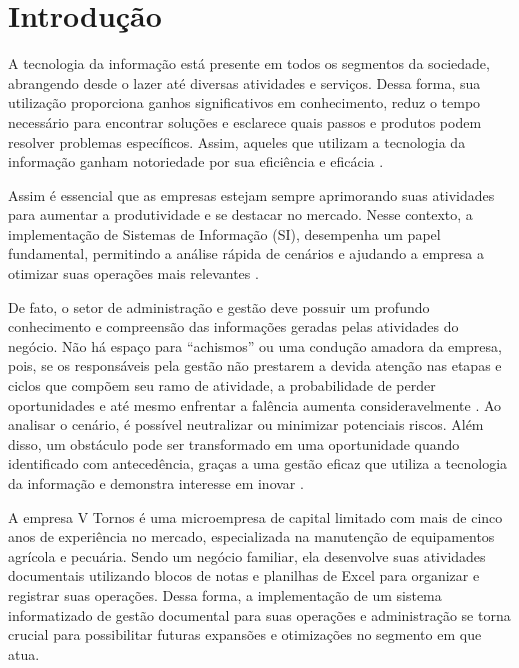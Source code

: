 \chapter{Introdução}\label{sec:Introdução}

A tecnologia da informação está presente em todos os segmentos da sociedade, abrangendo desde o lazer até diversas atividades e serviços. Dessa forma, sua utilização proporciona ganhos significativos em conhecimento, reduz o tempo necessário para encontrar soluções e esclarece quais passos e produtos podem resolver problemas específicos. Assim, aqueles que utilizam a tecnologia da informação ganham notoriedade por sua eficiência e eficácia \mbox{\cite{a:gestao_inovacao_2024}.}

 Assim é essencial que as empresas estejam sempre aprimorando suas atividades para aumentar a produtividade e se destacar no mercado. Nesse contexto, a implementação de Sistemas de Informação (SI), desempenha um papel fundamental, permitindo a análise rápida de cenários e ajudando a empresa a otimizar suas operações mais relevantes \mbox{\cite{a:tecnologia_empresa_2024}.}

De fato, o setor de administração e gestão deve possuir um profundo conhecimento e compreensão das informações geradas pelas atividades do negócio. Não há espaço para ``achismos'' ou uma condução amadora da empresa, pois, se os responsáveis pela gestão não prestarem a devida atenção nas etapas e ciclos que compõem seu ramo de atividade, a probabilidade de perder oportunidades e até mesmo enfrentar a falência aumenta consideravelmente \mbox{\cite{b:administracao_gestao_2024}}. Ao analisar o cenário, é possível neutralizar ou minimizar potenciais riscos. Além disso, um obstáculo pode ser transformado em uma oportunidade quando identificado com antecedência, graças a uma gestão eficaz que utiliza a tecnologia da informação e demonstra interesse em inovar \mbox{\cite{a:gestao_inovacao_2024}}.

A empresa V Tornos é uma microempresa de capital limitado com mais de cinco anos de experiência no mercado, especializada na manutenção de equipamentos agrícola e pecuária. Sendo um negócio familiar, ela desenvolve suas atividades documentais utilizando blocos de notas e planilhas de Excel para organizar e registrar suas operações. Dessa forma, a implementação de um sistema informatizado de gestão documental para suas operações e administração se torna crucial para possibilitar futuras expansões e otimizações no segmento em que atua.

